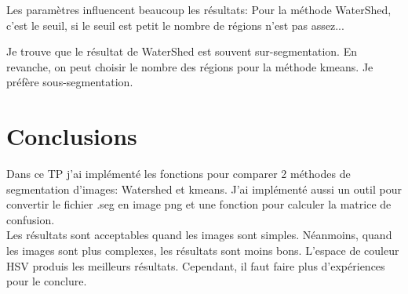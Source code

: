 \documentclass[article=a4, fontsize=11pt]{scrartcl}	%
\begin{document}
Les paramètres influencent beaucoup les résultats: Pour la méthode WaterShed, c'est le seuil, si le seuil est petit le nombre de régions n'est pas assez...  

Je trouve que le résultat de WaterShed est souvent sur-segmentation. En revanche, on peut choisir le nombre des régions pour la méthode kmeans. Je préfère sous-segmentation. 
  
\section{Conclusions}
Dans ce TP j’ai implémenté les fonctions pour comparer 2 méthodes de segmentation d'images: Watershed et kmeans. J'ai implémenté aussi un outil pour convertir le fichier .seg en image png et une fonction pour calculer la matrice de confusion.\\
Les résultats sont acceptables quand les images sont simples. Néanmoins, quand les images sont plus complexes, les résultats sont moins bons. 
L'espace de couleur HSV produis les meilleurs résultats. Cependant, il faut faire plus d'expériences pour le conclure.
\end{document}
